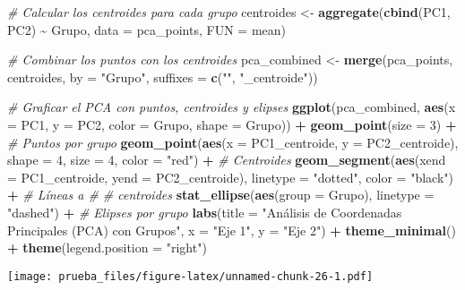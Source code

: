 \documentclass[
]{article}
\newenvironment{Shaded}{\begin{snugshade}}{\end{snugshade}}
\newcommand{\AttributeTok}[1]{\textcolor[rgb]{0.13,0.29,0.53}{#1}}
\newcommand{\CommentTok}[1]{\textcolor[rgb]{0.56,0.35,0.01}{\textit{#1}}}
\newcommand{\DecValTok}[1]{\textcolor[rgb]{0.00,0.00,0.81}{#1}}
\newcommand{\FunctionTok}[1]{\textcolor[rgb]{0.13,0.29,0.53}{\textbf{#1}}}
\newcommand{\NormalTok}[1]{#1}
\newcommand{\OtherTok}[1]{\textcolor[rgb]{0.56,0.35,0.01}{#1}}
\newcommand{\SpecialCharTok}[1]{\textcolor[rgb]{0.81,0.36,0.00}{\textbf{#1}}}
\newcommand{\StringTok}[1]{\textcolor[rgb]{0.31,0.60,0.02}{#1}}
\begin{document}
\begin{Shaded}
\begin{Highlighting}[]
\CommentTok{\# Calcular los centroides para cada grupo}
\NormalTok{centroides }\OtherTok{\textless{}{-}} \FunctionTok{aggregate}\NormalTok{(}\FunctionTok{cbind}\NormalTok{(PC1, PC2) }\SpecialCharTok{\textasciitilde{}}\NormalTok{ Grupo, }\AttributeTok{data =}\NormalTok{ pca\_points, }\AttributeTok{FUN =}\NormalTok{ mean)}

\CommentTok{\# Combinar los puntos con los centroides}
\NormalTok{pca\_combined }\OtherTok{\textless{}{-}} \FunctionTok{merge}\NormalTok{(pca\_points, centroides, }\AttributeTok{by =} \StringTok{"Grupo"}\NormalTok{, }\AttributeTok{suffixes =} \FunctionTok{c}\NormalTok{(}\StringTok{""}\NormalTok{, }\StringTok{"\_centroide"}\NormalTok{))}

\CommentTok{\# Graficar el PCA con puntos, centroides y elipses}
\FunctionTok{ggplot}\NormalTok{(pca\_combined, }\FunctionTok{aes}\NormalTok{(}\AttributeTok{x =}\NormalTok{ PC1, }\AttributeTok{y =}\NormalTok{ PC2, }\AttributeTok{color =}\NormalTok{ Grupo, }\AttributeTok{shape =}\NormalTok{ Grupo)) }\SpecialCharTok{+}
  \FunctionTok{geom\_point}\NormalTok{(}\AttributeTok{size =} \DecValTok{3}\NormalTok{) }\SpecialCharTok{+}  \CommentTok{\# Puntos por grupo}
  \FunctionTok{geom\_point}\NormalTok{(}\FunctionTok{aes}\NormalTok{(}\AttributeTok{x =}\NormalTok{ PC1\_centroide, }\AttributeTok{y =}\NormalTok{ PC2\_centroide), }\AttributeTok{shape =} \DecValTok{4}\NormalTok{, }\AttributeTok{size =} \DecValTok{4}\NormalTok{, }\AttributeTok{color =} \StringTok{"red"}\NormalTok{) }\SpecialCharTok{+}  \CommentTok{\# Centroides}
  \FunctionTok{geom\_segment}\NormalTok{(}\FunctionTok{aes}\NormalTok{(}\AttributeTok{xend =}\NormalTok{ PC1\_centroide, }\AttributeTok{yend =}\NormalTok{ PC2\_centroide), }\AttributeTok{linetype =} \StringTok{"dotted"}\NormalTok{, }\AttributeTok{color =} \StringTok{"black"}\NormalTok{) }\SpecialCharTok{+}  \CommentTok{\# Líneas a \# \# centroides}
  \FunctionTok{stat\_ellipse}\NormalTok{(}\FunctionTok{aes}\NormalTok{(}\AttributeTok{group =}\NormalTok{ Grupo), }\AttributeTok{linetype =} \StringTok{"dashed"}\NormalTok{) }\SpecialCharTok{+}  \CommentTok{\# Elipses por grupo}
  \FunctionTok{labs}\NormalTok{(}\AttributeTok{title =} \StringTok{"Análisis de Coordenadas Principales (PCA) con Grupos"}\NormalTok{, }
       \AttributeTok{x =} \StringTok{"Eje 1"}\NormalTok{, }\AttributeTok{y =} \StringTok{"Eje 2"}\NormalTok{) }\SpecialCharTok{+}
  \FunctionTok{theme\_minimal}\NormalTok{() }\SpecialCharTok{+}
  \FunctionTok{theme}\NormalTok{(}\AttributeTok{legend.position =} \StringTok{"right"}\NormalTok{)}
\end{Highlighting}
\end{Shaded}

\texttt{[image: prueba\_files/figure-latex/unnamed-chunk-26-1.pdf]}
\end{document}
